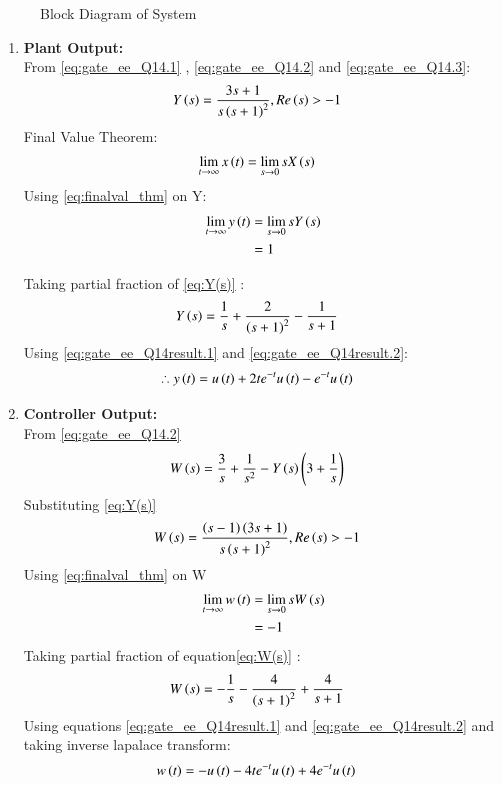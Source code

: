 \documentclass[journal,12pt,twocolumn]{IEEEtran}
\theoremstyle{remark}
\begin{document}
\begin{figure}[H]
    \resizebox{0.55\textwidth}{!}{}
    \caption{Block Diagram of System}
    \label{fig:gate_ee_Q14_blockdiagram}
\end{figure}
\begin{enumerate}
\item \textbf{Plant Output:}\\
From \eqref{eq:gate_ee_Q14.1} , \eqref{eq:gate_ee_Q14.2} and \eqref{eq:gate_ee_Q14.3}:
\begin{align}
    Y\left(s\right) &=  \frac{3s+1}{s\left(s+1\right)^2} ,  Re\left(s\right)>-1 \label{eq:Y(s)}
\end{align}
Final Value Theorem:    
\begin{align}
    \lim_{t \to \infty} x\left(t\right)&= \lim_{s \to 0} sX\left(s\right)\label{eq:finalval_thm}
\end{align}
Using \eqref{eq:finalval_thm} on Y:
\begin{align}
     \lim_{t \to \infty} y\left(t\right)&= \lim_{s \to 0} sY\left(s\right)\\
                            &= 1
\end{align}

Taking partial fraction of \eqref{eq:Y(s)} :
\begin{align}
    Y\left(s\right) &= \frac{1}{s} + \frac{2}{\left(s+1\right)^2} - \frac{1}{s+1}
\end{align}
Using \eqref{eq:gate_ee_Q14result.1} and \eqref{eq:gate_ee_Q14result.2}:
\begin{align}
    \therefore y\left(t\right) &= u\left(t\right)+ 2t e^{-t}u\left(t\right) - e^{-t}u\left(t\right)
\end{align}
\item \textbf{Controller Output:}\\
From \eqref{eq:gate_ee_Q14.2}
\begin{align}
     W\left(s\right) &= \frac{3}{s} + \frac{1}{s^2} - Y\left(s\right)\left(3+\frac{1}{s}\right)
\end{align}
Substituting \eqref{eq:Y(s)}
\begin{align}
    W\left(s\right) &= \frac{\left(s-1\right)\left(3s+1\right)}{s\left(s+1\right)^2} ,  Re\left(s\right)>-1 \label{eq:W(s)}
\end{align}
Using \eqref{eq:finalval_thm} on W
\begin{align}
     \lim_{t \to \infty} w\left(t\right)&= \lim_{s \to 0} sW\left(s\right)\\
                            &= -1
\end{align}
Taking partial fraction of equation\eqref{eq:W(s)} :
\begin{align}
    W\left(s\right) &= -\frac{1}{s} - \frac{4}{\left(s+1\right)^2} + \frac{4}{s+1}
\end{align}
Using equations \eqref{eq:gate_ee_Q14result.1} and \eqref{eq:gate_ee_Q14result.2} and taking inverse lapalace transform:
\begin{align}
    w\left(t\right) &= -u\left(t\right)-4t e^{-t}u\left(t\right) +4 e^{-t}u\left(t\right)
\end{align}


\end{enumerate}
\end{document}
